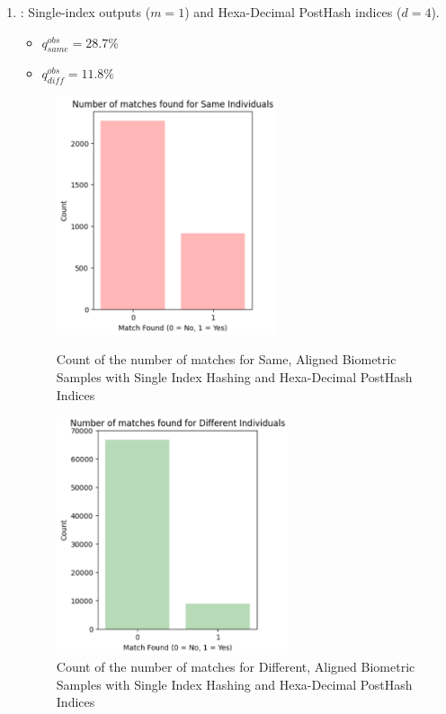 \begin{enumerate}
    \item {}: Single-index outputs (\(m=1\)) and Hexa-Decimal PostHash indices (\(d=4\)).
    \begin{itemize}
        \item \(q_{same}^{obs} = 28.7\%\)
        \item \(q_{diff}^{obs} = 11.8\%\)
    \end{itemize}

    \begin{figure}[H]
        \centering
        \begin{minipage}[b]{0.48\linewidth}
            \centering
            \includegraphics[width=\linewidth,height=7cm,keepaspectratio]{latex-img/d4same.png}
            \caption{Count of the number of matches for Same, Aligned Biometric Samples with Single Index Hashing and Hexa-Decimal PostHash Indices}
            \label{mu_same}
        \end{minipage}
        \hfill
        \begin{minipage}[b]{0.48\linewidth}
            \centering
            \includegraphics[width=\linewidth,height=7cm,keepaspectratio]{latex-img/d4diff.png}
            \caption{Count of the number of matches for Different, Aligned Biometric Samples with Single Index Hashing and Hexa-Decimal PostHash Indices}
            \label{mu_diff}
        \end{minipage}
    \end{figure}
\end{enumerate}

